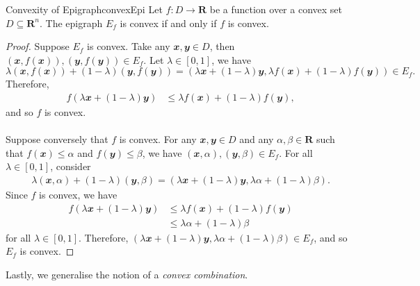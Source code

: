\documentclass[math]{amznotes}
\theoremstyle{remark}
\begin{document}
\begin{probox}{Convexity of Epigraph}{convexEpi}
    Let $f \colon D \to \mathbf{R}$ be a function over a convex set $D \subseteq \mathbf{R}^n$. The epigraph $E_f$ is convex if and only if $f$ is convex.
    \tcblower   
    \begin{proof}
        Suppose $E_f$ is convex. Take any $\mathbfit{x}, \mathbfit{y} \in D$, then $(\mathbfit{x}, f(\mathbfit{x})), (\mathbfit{y}, f(\mathbfit{y})) \in E_f$. Let $\lambda \in [0, 1]$, we have
        \begin{displaymath}
            \lambda(\mathbfit{x}, f(\mathbfit{x})) + (1 - \lambda)(\mathbfit{y}, f(\mathbfit{y})) = (\lambda\mathbfit{x} + (1 - \lambda)\mathbfit{y}, \lambda f(\mathbfit{x}) + (1 - \lambda)f(\mathbfit{y})) \in E_f.
        \end{displaymath}
        Therefore, 
        \begin{align*}
            f\left(\lambda\mathbfit{x} + (1 - \lambda)\mathbfit{y}\right) & \leq \lambda f(\mathbfit{x}) + (1 - \lambda)f(\mathbfit{y}),
        \end{align*}
        and so $f$ is convex.
        \\\\
        Suppose conversely that $f$ is convex. For any $\mathbfit{x}, \mathbfit{y} \in D$ and any $\alpha, \beta \in \mathbf{R}$ such that $f(\mathbfit{x}) \leq \alpha$ and $f(\mathbfit{y}) \leq \beta$, we have $(\mathbfit{x}, \alpha), (\mathbfit{y}, \beta) \in E_f$. For all $\lambda \in [0, 1]$, consider
        \begin{align*}
            \lambda(\mathbfit{x}, \alpha) + (1 - \lambda)(\mathbfit{y}, \beta) = (\lambda\mathbfit{x} + (1 - \lambda)\mathbfit{y}, \lambda\alpha + (1 - \lambda)\beta).
        \end{align*}
        Since $f$ is convex, we have
        \begin{align*}
            f\left(\lambda\mathbfit{x} + (1 - \lambda)\mathbfit{y}\right) & \leq \lambda f(\mathbfit{x}) + (1 - \lambda)f(\mathbfit{y}) \\
            & \leq \lambda\alpha + (1 - \lambda)\beta
        \end{align*}
        for all $\lambda \in [0, 1]$. Therefore, $(\lambda\mathbfit{x} + (1 - \lambda)\mathbfit{y}, \lambda\alpha + (1 - \lambda)\beta) \in E_f$, and so $E_f$ is convex.
    \end{proof}
\end{probox}
Lastly, we generalise the notion of a \textit{convex combination}.
\end{document}
